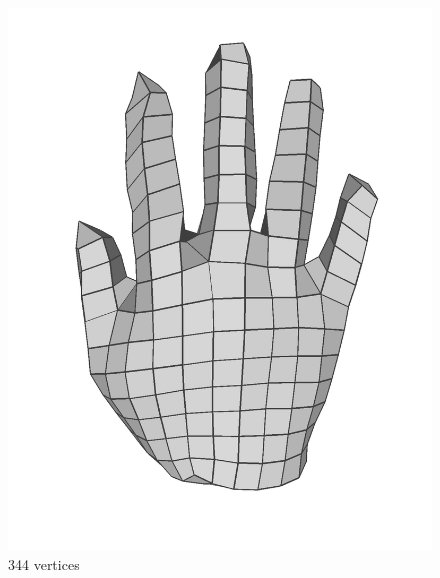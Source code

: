 \begin{figure}
\begin{minipage}{0.24\linewidth}
\includegraphics[width=\linewidth]{quadriflow/evaluation/coarse02.png}
344 vertices
\end{minipage}
\begin{minipage}{0.24\linewidth}
\centering

\end{minipage}
\end{figure}
